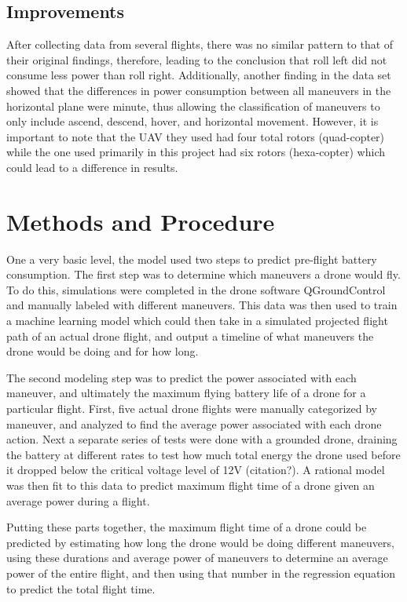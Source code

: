 \documentclass{article}
\begin{document}
\subsection{Improvements}
After collecting data from several flights, there was no similar pattern to that of their original findings, therefore, leading to the conclusion that roll left did not consume less power than roll right. Additionally, another finding in the data set showed that the differences in power consumption between all maneuvers in the horizontal plane were minute, thus allowing the classification of maneuvers to only include ascend, descend, hover, and horizontal movement. However, it is important to note that the UAV they used had four total rotors (quad-copter) while the one used primarily in this project had six rotors (hexa-copter) which could lead to a difference in results.




\section{Methods and Procedure}

One a very basic level, the model used two steps to predict pre-flight battery consumption. The first step was to determine which maneuvers a drone would fly. To do this, simulations were completed in the drone software QGroundControl and manually labeled with different maneuvers. This data was then used to train a machine learning model which could then take in a simulated projected flight path of an actual drone flight, and output a timeline of what maneuvers the drone would be doing and for how long.\par

The second modeling step was to predict the power associated with each maneuver, and ultimately the maximum flying battery life of a drone for a particular flight. First, five actual drone flights were manually categorized by maneuver, and analyzed to find the average power associated with each drone action. Next a separate series of tests were done with a grounded drone, draining the battery at different rates to test how much total energy the drone used before it dropped below the critical voltage level of 12V (citation?). A rational model was then fit to this data to predict maximum flight time of a drone given an average power during a flight.\par

Putting these parts together, the maximum flight time of a drone could be predicted by estimating how long the drone would be doing different maneuvers, using these durations and average power of maneuvers to determine an average power of the entire flight, and then using that number in the regression equation to predict the total flight time.
\end{document}
